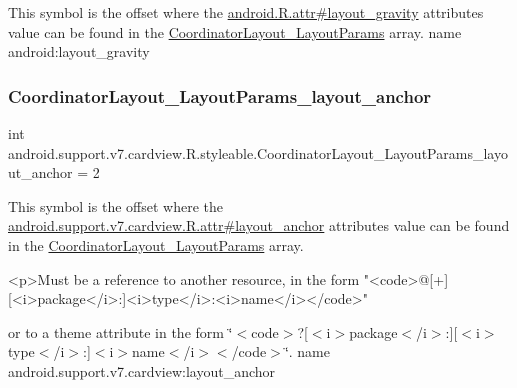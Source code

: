 This symbol is the offset where the \hyperlink{}{android.\+R.\+attr\#layout\+\_\+gravity} attribute\textquotesingle{}s value can be found in the \hyperlink{classandroid_1_1support_1_1v7_1_1cardview_1_1R_1_1styleable_afac1c5752b8eb35d30db48df7a9eea89}{Coordinator\+Layout\+\_\+\+Layout\+Params} array.  name android\+:layout\+\_\+gravity \mbox{\label{classandroid_1_1support_1_1v7_1_1cardview_1_1R_1_1styleable_a9b8fc3c3e83fa23e3b7600c6fac01f94}} 
\subsubsection{\texorpdfstring{Coordinator\+Layout\+\_\+\+Layout\+Params\+\_\+layout\+\_\+anchor}{CoordinatorLayout\_LayoutParams\_layout\_anchor}}
{\footnotesize\ttfamily int android.\+support.\+v7.\+cardview.\+R.\+styleable.\+Coordinator\+Layout\+\_\+\+Layout\+Params\+\_\+layout\+\_\+anchor = 2\hspace{0.3cm}{\ttfamily [static]}}

This symbol is the offset where the \hyperlink{classandroid_1_1support_1_1v7_1_1cardview_1_1R_1_1attr_afc4b9010c3937b0764107dd38f877e13}{android.\+support.\+v7.\+cardview.\+R.\+attr\#layout\+\_\+anchor} attribute\textquotesingle{}s value can be found in the \hyperlink{classandroid_1_1support_1_1v7_1_1cardview_1_1R_1_1styleable_afac1c5752b8eb35d30db48df7a9eea89}{Coordinator\+Layout\+\_\+\+Layout\+Params} array.

\begin{DoxyVerb}      <p>Must be a reference to another resource, in the form "<code>@[+][<i>package</i>:]<i>type</i>:<i>name</i></code>"
\end{DoxyVerb}
 or to a theme attribute in the form \char`\"{}$<$code$>$?\mbox{[}$<$i$>$package$<$/i$>$\+:\mbox{]}\mbox{[}$<$i$>$type$<$/i$>$\+:\mbox{]}$<$i$>$name$<$/i$>$$<$/code$>$\char`\"{}.  name android.\+support.\+v7.\+cardview\+:layout\+\_\+anchor \mbox{\label{classandroid_1_1support_1_1v7_1_1cardview_1_1R_1_1styleable_a45b105447f04b1d7316dfedc36cf454f}} 
